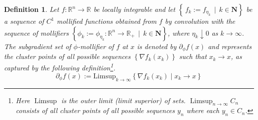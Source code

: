 \documentclass[11pt,reqno]{amsart}
\newcommand{\1}{{\bf 1}}
\newcommand{\2}{{\bf 2}}
\newcommand{\mr}[1]{{\color{blue}#1}}
\newcommand{\us}[1]{\textcolor{red}{#1}}
\numberwithin{equation}{section}
\newtheorem{definition}{Definition}[section]
\theoremstyle{remark}
\begin{document}
{	
	\begin{definition}\label{Def:subgradmoli}{\cite[Def 4.1.]{ermoliev1995minimization}}
		Let $f: \mathbb{R}^n \rightarrow \mathbb{R}$ be locally integrable and let $\left\{\, f_k:=f_{\eta_k} \, \mid \, k \in \mathbf{N}\right\}$ be a sequence of $C^1$ mollified functions obtained from $f$ by convolution with the sequence of mollifiers $\left\{\phi_k:=\phi_{\eta_k}: \mathbb{R}^n \rightarrow \mathbb{R}_{+} \, \mid \, k \in \mathbf{N}\right\}$, where $\eta_k \downarrow 0$ as $k \rightarrow \infty$.  The subgradient set of $\phi$-mollifier of $f$ at $x$ is denoted by $\partial_\phi f(x)$ and represents  the cluster points of all possible sequences $\left\{\nabla f_k\left(x_k\right)\right\}$ such that $x_k \rightarrow x$, as captured by the following definition\footnote{Here $\operatorname{Limsup}$ is the outer limit (limit superior) of sets. $\operatorname{Limsup}_{n\rightarrow\infty}C_n$ consists of all cluster points of all possible sequences $y_n$ where each $y_n\in C_n$.}.
		$$
		\partial_\phi f(x):=\mbox{Limsup}_{k \rightarrow \infty}\left\{\nabla f_k\left(x_k\right) \mid x_k \rightarrow x\right\} 
		$$
	\end{definition}
	
	\medskip
	
}
\end{document}
